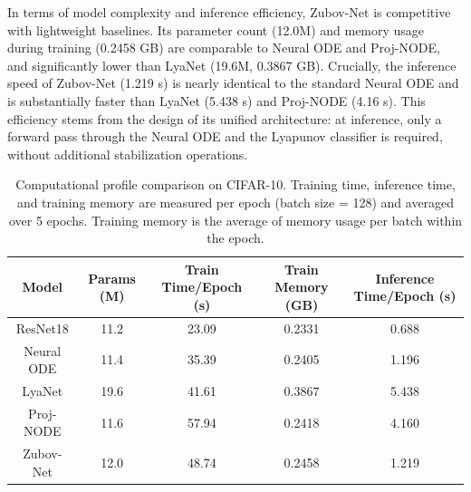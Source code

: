 \documentclass[journal]{IEEEtran}
\begin{document}
In terms of model complexity and inference efficiency, Zubov-Net is competitive with lightweight baselines. Its parameter count (12.0M) and memory usage during training (0.2458 GB) are comparable to Neural ODE and Proj-NODE, and significantly lower than LyaNet (19.6M, 0.3867 GB). Crucially, the inference speed of Zubov-Net (1.219 s) is nearly identical to the standard Neural ODE and is substantially faster than LyaNet (5.438 s) and Proj-NODE (4.16 s). This efficiency stems from the design of its unified architecture: at inference, only a forward pass through the Neural ODE and the Lyapunov classifier is required, without additional stabilization operations.
\begin{table}[ht]
	\centering
	\caption{Computational profile comparison on CIFAR-10. Training time, inference time, and training memory are measured per epoch (batch size = 128) and averaged over 5 epochs. Training memory is the average of memory usage per batch within the epoch.} 
	\label{table:efff}
	\begin{tabular}{ccccc}
		\toprule
		\textbf{Model} & \textbf{Params (M)} & \textbf{Train Time/Epoch (s)} & \textbf{Train Memory (GB)} & \textbf{Inference Time/Epoch (s)} \\  \midrule
		ResNet18       & 11.2                & 23.09                         & 0.2331                     & 0.688                              \\
		Neural ODE     & 11.4                & 35.39                         & 0.2405                     & 1.196                              \\
		LyaNet         & 19.6                & 41.61                         & 0.3867                     & 5.438                              \\
		Proj-NODE      & 11.6                & 57.94                         & 0.2418                     & 4.160                               \\
		Zubov-Net      & 12.0                  & 48.74                         & 0.2458                     & 1.219                             \\ \bottomrule
	\end{tabular}
\end{table}
\end{document}
